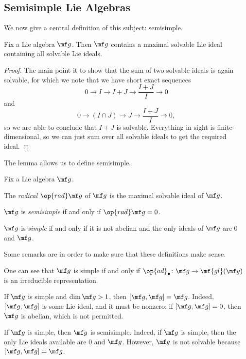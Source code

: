 \documentclass[../notes.tex]{subfiles}
\begin{document}
\subsection{Semisimple Lie Algebras}
We now give a central definition of this subject: semisimple.
\begin{lemma}
	Fix a Lie algebra $\mf g$. Then $\mf g$ contains a maximal solvable Lie ideal containing all solvable Lie ideals.
\end{lemma}
\begin{proof}
	The main point it to show that the sum of two solvable ideals is again solvable, for which we note that we have short exact sequences
	\[0\to I\to I+J\to\frac{I+J}I\to0\]
	and
	\[0\to (I\cap J)\to J\to\frac{I+J}I\to0,\]
	so we are able to conclude that $I+J$ is solvable. Everything in sight is finite-dimensional, so we can just sum over all solvable ideals to get the required ideal.
\end{proof}
The lemma allows us to define semisimple.
\begin{defihelper}   
	Fix a Lie algebra $\mf g$.
	\begin{listalph}
		\item The \textit{radical} $\op{rad}\mf g$ of $\mf g$ is the maximal solvable ideal of $\mf g$.
		\item $\mf g$ is \textit{semisimple} if and only if $\op{rad}\mf g=0$.
		\item $\mf g$ is \textit{simple} if and only if it is not abelian and the only ideals of $\mf g$ are $0$ and $\mf g$.
	\end{listalph}
\end{defihelper}
Some remarks are in order to make sure that these definitions make sense.
\begin{remark}
	One can see that $\mf g$ is simple if and only if $\op{ad}_\bullet\colon\mf g\to\mf{gl}(\mf g)$ is an irreducible representation.
\end{remark}
\begin{remark}
	If $\mf g$ is simple and $\dim\mf g>1$, then $[\mf g,\mf g]=\mf g$. Indeed, $[\mf g,\mf g]$ is some Lie ideal, and it must be nonzero: if $[\mf g,\mf g]=0$, then $\mf g$ is abelian, which is not permitted.
\end{remark}
\begin{remark}
	If $\mf g$ is simple, then $\mf g$ is semisimple. Indeed, if $\mf g$ is simple, then the only Lie ideals available are $0$ and $\mf g$. However, $\mf g$ is not solvable because $[\mf g,\mf g]=\mf g$.
\end{remark}
\end{document}
